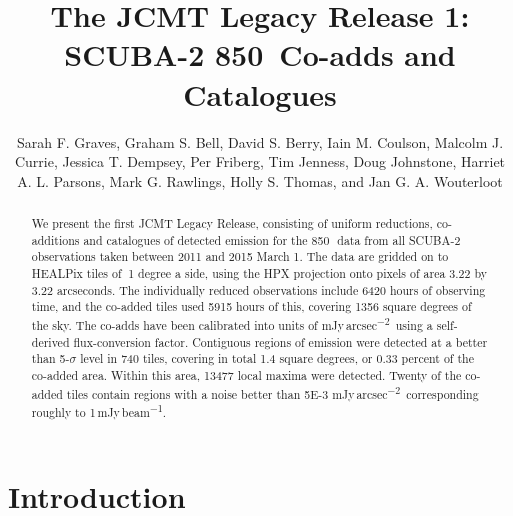 \documentclass[twocolumn,times]{aastex6}
\newcommand{\um}{\micron}
\newcommand{\jyas}{Jy\,arcsec\textsuperscript{$-$2}}
\newcommand{\jybm}{Jy\,beam\textsuperscript{$-$1}}
\begin{document}
\title{The JCMT Legacy Release 1: SCUBA-2 850\micron\ Co-adds and Catalogues}

\author{Sarah F. Graves,
     Graham S. Bell,
     David S. Berry,
     Iain M. Coulson,
     Malcolm J. Currie,
     Jessica T. Dempsey,
     Per Friberg,
     Tim Jenness,
     Doug Johnstone,
     Harriet A. L. Parsons,
     Mark G. Rawlings,
     Holly S. Thomas,
    and Jan G. A. Wouterloot
}

\begin{abstract}
  We present the first JCMT Legacy Release, consisting of uniform
  reductions, co-additions and catalogues of detected emission for the
  850\,\um\ data from all SCUBA-2 observations taken between 2011 and
  2015 March 1. The data are gridded on to HEALPix
  tiles of $~$1 degree a side, using the HPX projection onto pixels of
  area 3.22 by 3.22 arcseconds. The individually reduced observations
  include 6420 hours of observing time, and the co-added tiles used
  5915 hours of this, covering 1356 square degrees of
  the sky. The co-adds have been calibrated into units of m\jyas\ using
  a self-derived flux-conversion factor. Contiguous regions of
  emission were detected at a better than 5-$\sigma$ level in 740
  tiles, covering in total 1.4 square degrees, or 0.33 percent of the
  co-added area. Within this area, 13477 local maxima were
  detected. Twenty of the co-added tiles contain regions with a noise
  better than 5E-3 m\jyas\, corresponding roughly to 1\,m\jybm.
\end{abstract}


\section{Introduction}
\end{document}
